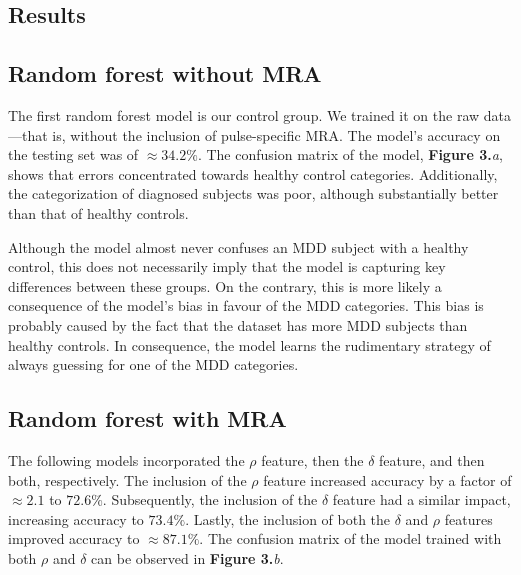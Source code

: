 \documentclass{article}
\begin{document}
\begin{multicols}{2}
\section{Results}

\subsection{Random forest without MRA}

The first random forest model is our control group. We trained it on the raw
data ---that is, without the inclusion of pulse-specific MRA. The model's
accuracy on the testing set was of $\approx34.2 \%$. The confusion matrix of the
model, \textbf{Figure 3.}\textit{a}, shows that errors concentrated towards
healthy control categories. Additionally, the categorization of diagnosed
subjects was poor, although substantially better than that of healthy controls. 

Although the model almost never confuses an MDD subject with a healthy control,
this does not necessarily imply that the model is capturing key differences
between these groups. On the contrary, this is more likely a consequence of the
model's bias in favour of the MDD categories. This bias is probably caused by
the fact that the dataset has more MDD subjects than healthy controls. In
consequence, the model learns the rudimentary strategy of always guessing for
one of the MDD categories.

\subsection{Random forest with MRA}

The following models incorporated the $\rho$ feature, then the $\delta$ feature,
and then both, respectively. The inclusion of the $\rho$ feature increased
accuracy by a factor of $\approx 2.1$ to $72.6\%$. Subsequently, the inclusion
of the $\delta$ feature had a similar impact, increasing accuracy to $73.4\%$.
Lastly, the inclusion of both the $\delta$ and $\rho$ features improved accuracy
to $\approx 87.1\%$. The confusion matrix of the model trained with both $\rho$
and $\delta$ can be observed in \textbf{Figure 3.}\textit{b}.


\end{multicols}
\end{document}
